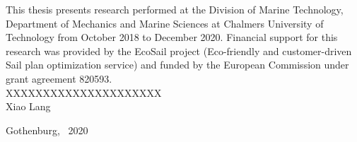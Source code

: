 \vspace{0cm}
This thesis presents research performed at the Division of Marine Technology, Department of Mechanics and Marine Sciences at Chalmers University of Technology from October 2018 to December 2020. Financial support for this research was provided by the EcoSail project (Eco-friendly and customer-driven Sail plan optimization service) and funded by the European Commission under grant agreement 820593.\\

\noindent XXXXXXXXXXXXXXXXXXXXX\\



\vfill
\vfill
\hfill   Xiao Lang

\hfill  Gothenburg, \TheMonth~2020

\vfill

\clearpage


